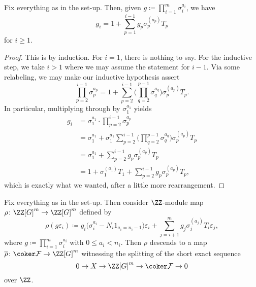 \documentclass{article}
\numberwithin{equation}{section}
\begin{document}
\begin{lemma} \label{lem:expandgi}
	Fix everything as in the set-up. Then, given $g\coloneqq\prod_{i=1}^m\sigma_i^{a_i}$, we have
	\[g_i=1+\sum_{p=1}^{i-1}g_p\sigma_p^{(a_p)}T_p\]
	for $i\ge1$.
\end{lemma}
\begin{proof}
	This is by induction. For $i=1$, there is nothing to say. For the inductive step, we take $i>1$ where we may assume the statement for $i-1$. Via some relabeling, we may make our inductive hypothesis assert
	\[\prod_{p=2}^{i-1}\sigma_p^{a_p}=1+\sum_{p=2}^{i-1}\Bigg(\prod_{q=2}^{p-1}\sigma_q^{a_q}\Bigg)\sigma_p^{(a_p)}T_p.\]
	In particular, multiplying through by $\sigma_1^{a_1}$ yields
	\begin{align*}
		g_i &= \sigma_1^{a_1}\cdot\prod_{p=2}^{i-1}\sigma_p^{a_p} \\
		&= \sigma_1^{a_1}+\sigma_1^{a_1}\sum_{p=2}^{i-1}\Bigg(\prod_{q=2}^{p-1}\sigma_q^{a_q}\Bigg)\sigma_p^{(a_p)}T_p \\
		&= \sigma_1^{a_1}+\sum_{p=2}^{i-1}g_p\sigma_p^{(a_p)}T_p \\
		&= 1+\sigma_1^{(a_1)}T_1+\sum_{p=2}^{i-1}g_p\sigma_p^{(a_p)}T_p,
	\end{align*}
	which is exactly what we wanted, after a little more rearrangement.
\end{proof}
\begin{lemma} \label{lem:sessplits}
	Fix everything as in the set-up. Then consider $\ZZ$-module map $\rho\colon\ZZ[G]^m\to\ZZ[G]^m$ defined by
	\[\rho(g\varepsilon_i)\coloneqq g_i\big(\sigma_i^{a_i}-N_i1_{a_i=n_i-1}\big)\varepsilon_i+\sum_{j=i+1}^mg_j\sigma_j^{(a_j)}T_i\varepsilon_j,\]
	where $g\coloneqq\prod_{i=1}^m\sigma_i^{a_i}$ with $0\le a_i<n_i$. Then $\rho$ descends to a map $\overline\rho\colon\coker\mathcal F\to\ZZ[G]^m$ witnessing the splitting of the short exact sequence
	\[0\to X\to\ZZ[G]^m\to\coker\mathcal F\to0\]
	over $\ZZ$.
\end{lemma}
\end{document}
